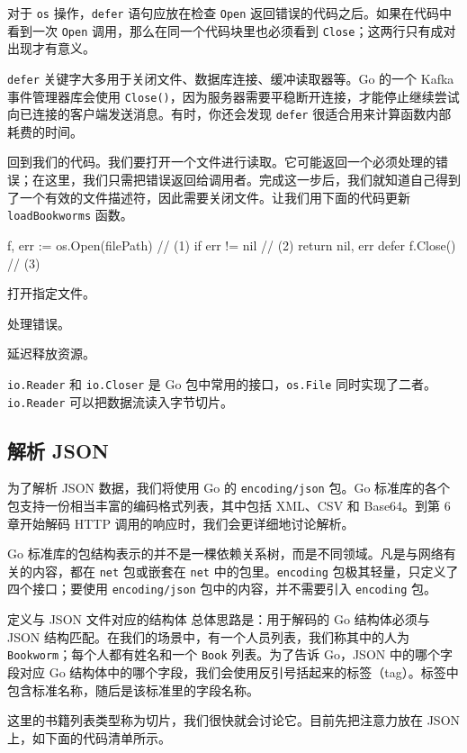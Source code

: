 对于 \texttt{os} 操作，\texttt{defer} 语句应放在检查 \texttt{Open} 返回错误的代码之后。如果在代码中看到一次 \texttt{Open} 调用，那么在同一个代码块里也必须看到 \texttt{Close}；这两行只有成对出现才有意义。

\texttt{defer} 关键字大多用于关闭文件、数据库连接、缓冲读取器等。Go 的一个 Kafka 事件管理器库会使用 \texttt{Close()}，因为服务器需要平稳断开连接，才能停止继续尝试向已连接的客户端发送消息。有时，你还会发现 \texttt{defer} 很适合用来计算函数内部耗费的时间。

回到我们的代码。我们要打开一个文件进行读取。它可能返回一个必须处理的错误；在这里，我们只需把错误返回给调用者。完成这一步后，我们就知道自己得到了一个有效的文件描述符，因此需要关闭文件。让我们用下面的代码更新 \texttt{loadBookworms} 函数。

\begin{gocode}[title={代码清单 3.3 \texttt{bookworm.go}：打开文件}]
f, err := os.Open(filePath) // (1)
if err != nil {            // (2)
    return nil, err
}
defer f.Close()             // (3)
\end{gocode}

\begin{codeannotations}
  \item 打开指定文件。
  \item 处理错误。
  \item 延迟释放资源。
\end{codeannotations}

\texttt{io.Reader} 和 \texttt{io.Closer} 是 Go 包中常用的接口，\texttt{os.File} 同时实现了二者。\texttt{io.Reader} 可以把数据流读入字节切片。

\subsection{解析 JSON}

为了解析 JSON 数据，我们将使用 Go 的 \texttt{encoding/json} 包。Go 标准库的各个包支持一份相当丰富的编码格式列表，其中包括
XML、CSV 和 Base64。到第 6 章开始解码 HTTP 调用的响应时，我们会更详细地讨论解析。

Go 标准库的包结构表示的并不是一棵依赖关系树，而是不同领域。凡是与网络有关的内容，都在 \texttt{net} 包或嵌套在 \texttt{net} 中的包里。\texttt{encoding} 包极其轻量，只定义了四个接口；要使用 \texttt{encoding/json} 包中的内容，并不需要引入 \texttt{encoding} 包。

\begin{infobox}{定义与 JSON 文件对应的结构体}
总体思路是：用于解码的 Go 结构体必须与 JSON 结构匹配。在我们的场景中，有一个人员列表，我们称其中的人为 \texttt{Bookworm}；每个人都有姓名和一个 \texttt{Book} 列表。为了告诉 Go，JSON 中的哪个字段对应 Go 结构体中的哪个字段，我们会使用反引号括起来的标签（tag）。标签中包含标准名称，随后是该标准里的字段名称。

这里的书籍列表类型称为切片，我们很快就会讨论它。目前先把注意力放在 JSON 上，如下面的代码清单所示。
\end{infobox}

